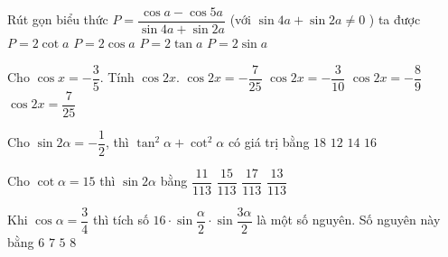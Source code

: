 \begin{ex}%
	Rút gọn biểu thức $P=\dfrac{\cos a-\cos 5a}{\sin 4a+\sin 2a}$ (với $\sin 4a+\sin 2a\ne 0$ ) ta được
	\choice
	{$P=2\cot a$}
	{$P=2\cos a$}
	{$P=2\tan a$}
	{\True $P=2\sin a$}
\end{ex}
\begin{ex}%
	Cho $\cos x=-\dfrac{3}{5}$. Tính $\cos 2x$.
	\choice 
	{\True $\cos 2x=-\dfrac{7}{25}$}
	{ $\cos 2x=-\dfrac{3}{10}$}
	{ $\cos 2x=-\dfrac{8}{9}$}
	{ $\cos 2x=\dfrac{7}{25}$} 
\end{ex} 

\begin{ex}%
	Cho $\sin 2 \alpha=-\dfrac{1}{2}$, thì $\tan ^2 \alpha+\cot ^2 \alpha$ có giá trị bằng	
	\choice
	{$18$}
	{$12$}
	{\True $14$}
	{$16$}
\end{ex}

\begin{ex}%
	Cho $\cot \alpha=15$ thì $\sin 2 \alpha$ bằng
	\choice
	{$\dfrac{11}{113}$}
	{\True $\dfrac{15}{113}$}
	{$\dfrac{17}{113}$}
	{$\dfrac{13}{113}$}
\end{ex}

\begin{ex}%
	Khi $\cos \alpha=\dfrac{3}{4}$ thì tích số $16 \cdot \sin \dfrac{\alpha}{2}\cdot \sin \dfrac{3 \alpha}{2}$ là một số nguyên. Số nguyên này bằng
	\choice
	{$6$}
	{$7$}
	{\True $5$}
	{$8$}
\end{ex}

